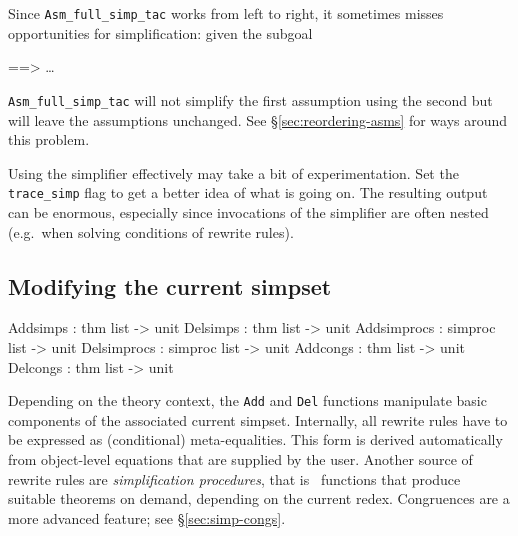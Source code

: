 \begin{warn}
  Since \verb$Asm_full_simp_tac$ works from left to right, it sometimes
misses opportunities for simplification: given the subgoal
\begin{ttbox}
{\out [| P (f a); f a = t |] ==> \dots}
\end{ttbox}
\verb$Asm_full_simp_tac$ will not simplify the first assumption using the
second but will leave the assumptions unchanged.  See
\S\ref{sec:reordering-asms} for ways around this problem.
\end{warn}

\medskip

Using the simplifier effectively may take a bit of experimentation.
Set the \verb$trace_simp$ flag to get
a better idea of what is going on.  The resulting output can be
enormous, especially since invocations of the simplifier are often
nested (e.g.\ when solving conditions of rewrite rules).


\subsection{Modifying the current simpset}
\begin{ttbox}
Addsimps    : thm list -> unit
Delsimps    : thm list -> unit
Addsimprocs : simproc list -> unit
Delsimprocs : simproc list -> unit
Addcongs    : thm list -> unit
Delcongs    : thm list -> unit
\end{ttbox}

Depending on the theory context, the \texttt{Add} and \texttt{Del}
functions manipulate basic components of the associated current
simpset.  Internally, all rewrite rules have to be expressed as
(conditional) meta-equalities.  This form is derived automatically
from object-level equations that are supplied by the user.  Another
source of rewrite rules are \emph{simplification procedures}, that is
\ML\ functions that produce suitable theorems on demand, depending on
the current redex.  Congruences are a more advanced feature; see
\S\ref{sec:simp-congs}.

